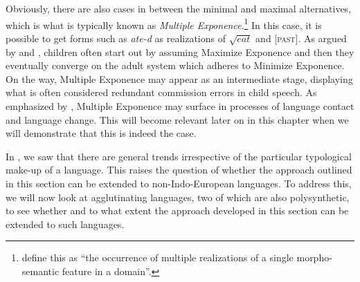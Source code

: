 \documentclass[output=paper,colorlinks,citecolor=brown,footheight=42pt]{langscibook}
\begin{document}
Obviously, there are also cases in between the minimal and maximal alternatives, which is what is typically known as \textit{Multiple Exponence}.\footnote{\citet[165]{caballeroharris2012} define this as “the occurrence of multiple realizations of a single morpho-semantic feature in a domain”.} In this case, it is possible to get forms such as \textit{ate-d} as realizations of $\sqrt{\textit{eat}}$ and [\textsc{past}]. As argued by \citet{alexiadou2021} and \citet{heinetal2022}, children often start out by assuming Maximize Exponence and then they eventually converge on the adult system which adheres to Minimize Exponence. On the way, Multiple Exponence may appear as an intermediate stage, displaying what is often considered redundant commission errors in child speech. As emphasized by \citet{alexiadou2021}, Multiple Exponence may surface in processes of language contact and language change. This will become relevant later on in this chapter when we will demonstrate that this is indeed the case.

In , we saw that there are general trends irrespective of the particular typological make-up of a language. This raises the question of whether the approach outlined in this section can be extended to non-Indo-European languages. To address this, we will now look at agglutinating languages, two of which are also polysynthetic, to see whether and to what extent the approach developed in this section can be extended to such languages.
\end{document}
